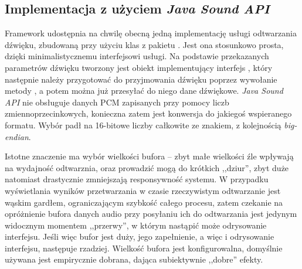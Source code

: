 \subsection{Implementacja z użyciem \emph{Java Sound API}}

Framework udostępnia na chwilę obecną jedną implementację usługi odtwarzania dźwięku, zbudowaną przy
użyciu klas z pakietu . Jest ona stosunkowo prosta, dzięki minimalistycznemu
interfejsowi usługi. Na podstawie przekazanych parametrów dźwięku tworzony jest obiekt
implementujący interfejs , który następnie należy przygotować do przyjmowania
dźwięku poprzez wywołanie metody , a potem można już przesyłać do niego dane dźwiękowe.
\emph{Java Sound API} nie obsługuje danych PCM zapisanych przy pomocy liczb zmiennoprzecinkowych,
konieczna zatem jest konwersja do jakiegoś wspieranego formatu. Wybór padł na 16-bitowe liczby
całkowite ze znakiem, z kolejnością \textit{big-endian}.

\begin{NoteLong}
Istotne znaczenie ma wybór wielkości bufora -- zbyt małe wielkości źle wpływają na wydajność
odtwarznia, oraz prowadzić mogą do krótkich ,,dziur'', zbyt duże natomiast drastycznie zmniejszają
responsywność systemu. W przypadku wyświetlania wyników przetwarzania w czasie rzeczywistym
odtwarzanie jest wąskim gardłem, ograniczającym szybkość całego procesu, zatem czekanie na
opróżnienie bufora danych audio przy posyłaniu ich do odtwarzania jest jedynym widocznym momentem
,,przerwy'', w którym nastąpić może odrysowanie interfejsu. Jeśli więc bufor jest duży, jego
zapełnienie, a więc i odrysowanie interfejsu, następuje rzadziej. Wielkość bufora jest
konfigurowalna, domyślnie używana jest empirycznie dobrana, dająca subiektywnie ,,dobre'' efekty.
\end{NoteLong}

